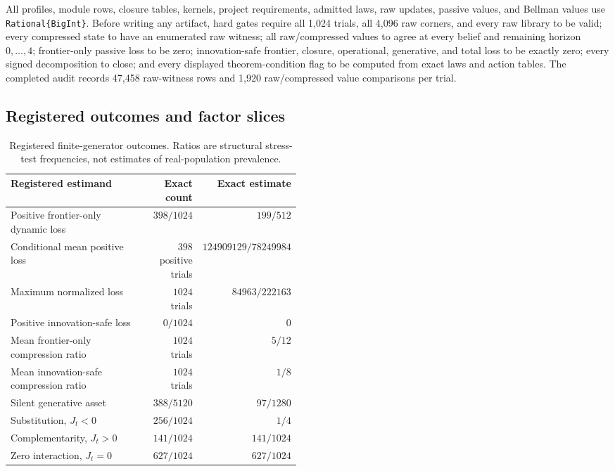 All profiles, module rows, closure tables, kernels, project requirements,
admitted laws, raw updates, passive values, and Bellman values use
\texttt{Rational\{BigInt\}}.  Before writing any artifact, hard gates require
all 1,024 trials, all 4,096 raw corners, and every raw library to be valid;
every compressed state to have an enumerated raw witness; all raw/compressed
values to agree at every belief and remaining horizon \(0,\ldots,4\);
frontier-only passive loss to be zero; innovation-safe frontier, closure,
operational, generative, and total loss to be exactly zero; every signed
decomposition to close; and every displayed theorem-condition flag to be
computed from exact laws and action tables.  The completed audit records
47,458 raw-witness rows and 1,920 raw/compressed value comparisons per trial.

\subsection{Registered outcomes and factor slices}

\begin{table}[htbp]
  \centering
  \small
  \begin{tabular}{@{}p{0.48\linewidth}rr@{}}
    \toprule
    Registered estimand & Exact count & Exact estimate \\
    \midrule
    Positive frontier-only dynamic loss
      & \(398/1024\) & \(199/512\) \\
    Conditional mean positive loss
      & \(398\) positive trials & \(124909129/78249984\) \\
    Maximum normalized loss
      & \(1024\) trials & \(84963/222163\) \\
    Positive innovation-safe loss
      & \(0/1024\) & \(0\) \\
    Mean frontier-only compression ratio
      & \(1024\) trials & \(5/12\) \\
    Mean innovation-safe compression ratio
      & \(1024\) trials & \(1/8\) \\
    Silent generative asset
      & \(388/5120\) & \(97/1280\) \\
    Substitution, \(J_t<0\)
      & \(256/1024\) & \(1/4\) \\
    Complementarity, \(J_t>0\)
      & \(141/1024\) & \(141/1024\) \\
    Zero interaction, \(J_t=0\)
      & \(627/1024\) & \(627/1024\) \\
    \bottomrule
  \end{tabular}
  \caption{Registered finite-generator outcomes.  Ratios are structural
  stress-test frequencies, not estimates of real-population prevalence.}
  \label{tab:supp-randomized-library-v2}
\end{table}

